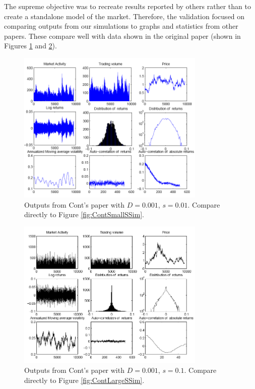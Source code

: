 \documentclass[runningheads]{llncs}
\begin{document}
The supreme objective was to recreate results reported by others rather than to create a standalone model of the market. Therefore, the validation focused on comparing outputs from our simulations to graphs and statistics from other papers. These compare well with data shown in the original paper (shown in Figures \ref{fig:ContSmallSPap} and \ref{fig:ContLargeSPap}).


\begin{figure}[htbp]
  \begin{center}
    \includegraphics[width=0.8\textwidth]{../graphics/Cont-Fig3.png}
    \caption{Outputs from Cont's paper with $D=0.001$, $s=0.01$. Compare directly to Figure \ref{fig:ContSmallSSim}.}
    \label{fig:ContSmallSPap}
  \end{center}
\end{figure}

\begin{figure}[htbp]
  \begin{center}
    \includegraphics[width=0.8\textwidth]{../graphics/Cont-Fig4.png}
    \caption{Outputs from Cont's paper with $D=0.001$, $s=0.1$. Compare directly to Figure \ref{fig:ContLargeSSim}.}
    \label{fig:ContLargeSPap}
  \end{center}
\end{figure}
\end{document}
